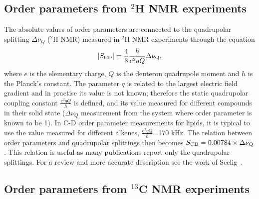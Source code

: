 \documentclass[aps,prl,superscriptaddress,twocolumn]{revtex4}
\begin{document}







 

\subsection{Order parameters from $^2$H NMR experiments}

The absolute values of order parameters are connected to the quadrupolar splitting $\Delta \nu_Q$ ($^2$H NMR) 
measured in $^2$H NMR experiments through the equation 
\begin{equation}\label{HNMRop}
|S_{{\rm CD}}|=\frac{4}{3} \frac{h}{e^2qQ} \Delta \nu_{{\rm Q}}, 
\end{equation}
where $e$ is the elementary charge, $Q$ is the deuteron quadrupole moment and $h$ is the Planck's constant. 
The parameter $q$ is related to the largest electric field gradient and in practise its value is not known; 
therefore the static quadrupolar coupling constant $\frac{e^2qQ}{h}$ is defined, and its value measured for 
different compounds in their solid state ($\Delta \nu_Q$ measurement from the system where order parameter is known to be 1). 
In C-D order parameter measurements for lipids, it is typical to 
use the value measured for different alkenes, $\frac{e^2qQ}{h}$=170 kHz. The relation between order parameters 
and quadrupolar splittings then becomes $S_{{\rm CD}}=0.00784 \times \Delta \nu_{{\rm Q}}$.
This relation is useful as many publications report only the quadrupolar splittings. For a review and more accurate description see the work of Seelig~\cite{seelig77c}.

\subsection{Order parameters from $^{13}$C NMR experiments}
\end{document}
